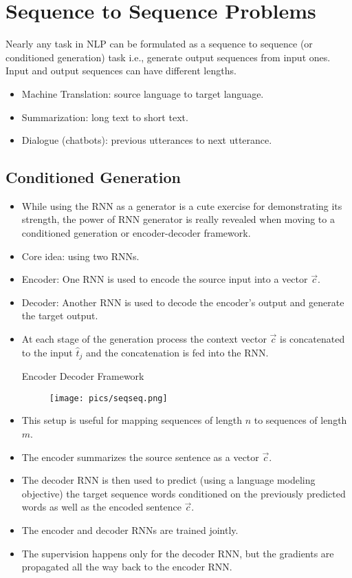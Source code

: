  



\section{Sequence to Sequence Problems}
Nearly any task in NLP can be formulated as a sequence to sequence (or conditioned generation) task i.e., generate output sequences from input ones. Input and output sequences can have different lengths.
\begin{itemize}
\item Machine Translation: source language to target language.
\item Summarization: long text to short text.
\item Dialogue (chatbots): previous utterances to next utterance.
\end{itemize}

\subsection{Conditioned Generation}
\begin{itemize}
\item While using the RNN as a generator is a cute exercise for demonstrating its strength, the power of RNN generator is really revealed when moving to a conditioned generation or encoder-decoder framework.
\item Core idea: using two RNNs.
\item Encoder: One RNN is used to encode the source input into a vector $\overrightarrow{c}$.
\item Decoder: Another RNN is used to decode the encoder's output and generate the target output.
\item At each stage of the generation process the context vector $\overrightarrow{c}$ is concatenated to the input $\hat{t}_j$ and the concatenation is fed into the RNN.
\begin{frame}{Encoder Decoder Framework}
         \begin{figure}[h]
        	\texttt{[image: pics/seqseq.png]}
        \end{figure}  
\end{frame}
\item This setup is useful for mapping sequences of length $n$ to sequences of length $m$.
\item The encoder summarizes the source sentence as a vector $\vec{c}$.
\item The decoder RNN is then used to predict (using a language modeling objective) the target sequence words conditioned on the previously predicted words as well as the encoded sentence $\vec{c}$.
\item The encoder and decoder RNNs are trained jointly.
\item The supervision happens only for the decoder RNN, but the gradients are propagated all the way back to the encoder RNN.
\end{itemize}



